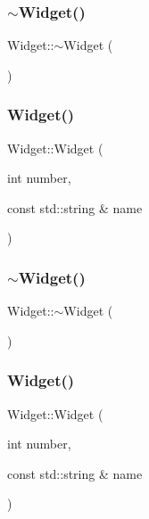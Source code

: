 \subsubsection{\texorpdfstring{$\sim$Widget()}{~Widget()}\hspace{0.1cm}{\footnotesize\ttfamily [1/3]}}
{\footnotesize\ttfamily Widget\+::$\sim$\+Widget (\begin{DoxyParamCaption}{ }\end{DoxyParamCaption})}

\mbox{\label{class_widget_ab573b75a8a69d29c298af2485fb9cda9}} 
\subsubsection{\texorpdfstring{Widget()}{Widget()}\hspace{0.1cm}{\footnotesize\ttfamily [2/3]}}
{\footnotesize\ttfamily Widget\+::\+Widget (\begin{DoxyParamCaption}\item[{int}]{number,  }\item[{const std\+::string \&}]{name }\end{DoxyParamCaption})}

\mbox{\label{class_widget_aa24f66bcbaaec6d458b0980e8c8eae65}} 
\subsubsection{\texorpdfstring{$\sim$Widget()}{~Widget()}\hspace{0.1cm}{\footnotesize\ttfamily [2/3]}}
{\footnotesize\ttfamily Widget\+::$\sim$\+Widget (\begin{DoxyParamCaption}{ }\end{DoxyParamCaption})}

\mbox{\label{class_widget_ab573b75a8a69d29c298af2485fb9cda9}} 
\subsubsection{\texorpdfstring{Widget()}{Widget()}\hspace{0.1cm}{\footnotesize\ttfamily [3/3]}}
{\footnotesize\ttfamily Widget\+::\+Widget (\begin{DoxyParamCaption}\item[{int}]{number,  }\item[{const std\+::string \&}]{name }\end{DoxyParamCaption})}

